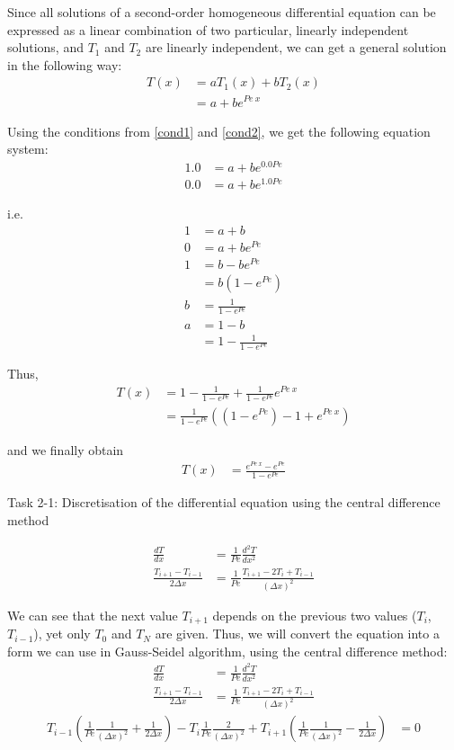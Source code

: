 \documentclass{article}
\begin{document}
Since all solutions of a second-order homogeneous differential equation can be expressed as a linear combination of two particular, linearly independent solutions, and $T_1$ and $T_2$ are linearly independent, we can get a general solution in the following way:
\begin{align}
  T(x) &= a T_1(x) + b T_2(x) \\
       &= a + b e^{Pe~x}
\end{align}

Using the conditions from \eqref{cond1} and \eqref{cond2}, we get the following equation system:
\begin{align}
  1.0 &= a + b e^{0.0 Pe} \\
  0.0 &= a + b e^{1.0 Pe}
\end{align}

i.e.
\begin{align}
  1 &= a + b \\
  0 &= a + b e^{Pe} \\
  1 &= b - b e^{Pe} \\
    &= b (1 - e^{Pe}) \\
  b &= \frac{1}{1 - e^{Pe}} \\
  a &= 1 - b \\
    &= 1 - \frac{1}{1 - e^{Pe}}
\end{align}

Thus,
\begin{align}
  T(x) &= 1 - \frac{1}{1 - e^{Pe}} + \frac{1}{1 - e^{Pe}} e^{Pe~x} \\
       &= \frac{1}{1 - e^{Pe}}((1 - e^{Pe}) - 1 + e^{Pe~x})
\end{align}

and we finally obtain
\begin{align}
  T(x) &= \frac{e^{Pe~x} - e^{Pe}}{1 - e^{Pe}}
\end{align}

Task 2-1: Discretisation of the differential equation using the central difference method

\begin{align}
  \frac{dT}{dx} &= \frac{1}{Pe}\frac{d^2 T}{dx^2} \\
  \frac{T_{i + 1} - T_{i - 1}}{2 \Delta x} &= \frac{1}{Pe} \frac{T_{i + 1} - 2 T_i + T_{i - 1}}{(\Delta x)^2}
\end{align}

We can see that the next value $T_{i + 1}$ depends on the previous two values ($T_i$, $T_{i - 1}$), yet only $T_0$ and $T_N$ are given. Thus, we will convert the equation into a form we can use in Gauss-Seidel algorithm, using the central difference method:
\begin{align}
  \frac{dT}{dx} &= \frac{1}{Pe}\frac{d^2 T}{dx^2} \\
  \frac{T_{i + 1} - T_{i - 1}}{2 \Delta x} &= \frac{1}{Pe} \frac{T_{i + 1} - 2 T_i + T_{i - 1}}{(\Delta x)^2}
\end{align}
\begin{align}
  T_{i - 1}(\frac{1}{Pe} \frac{1}{(\Delta x)^2} + \frac{1}{2 \Delta x}) - T_i \frac{1}{Pe} \frac{2}{(\Delta x)^2} + T_{i + 1}(\frac{1}{Pe} \frac{1}{(\Delta x)^2} - \frac{1}{2 \Delta x}) &= 0
\end{align}
\end{document}
